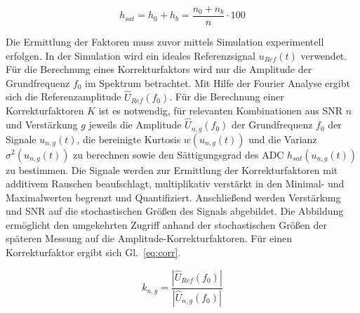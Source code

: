 \begin{equation}
	\label{eq:dist_sat}
	h_{sat} = h_0 + h_b = \frac{n_0 + n_b}{n} \cdot 100
\end{equation}

Die Ermittlung der Faktoren muss zuvor mittels Simulation experimentell erfolgen. In der Simulation wird ein ideales Referenzsignal $u_{Ref}(t)$ verwendet. Für die Berechnung eines Korrekturfaktors wird nur die Amplitude der Grundfrequenz $f_0$ im Spektrum betrachtet. Mit Hilfe der Fourier Analyse ergibt sich die Referenzamplitude $\hat{U}_{Ref}(f_0)$. Für die Berechnung einer Korrekturfaktoren $K$ ist es notwendig, für relevanten Kombinationen aus SNR $n$ und Verstärkung $g$ jeweils die Amplitude $\hat{U}_{n,g}(f_0)$ der Grundfrequenz $f_0$ der Signale $u_{n,g}(t)$, die bereinigte Kurtosis $w(u_{n,g}(t))$ und die Varianz $\sigma^2(u_{n,g}(t))$ zu berechnen sowie den Sättigungsgrad des ADC $h_{sat}(u_{n,g}(t))$ zu bestimmen. Die Signale werden zur Ermittlung der Korrekturfaktoren mit additivem Rauschen beaufschlagt, multiplikativ verstärkt in den Minimal- und Maximalwerten begrenzt und Quantifiziert. Anschließend werden Verstärkung und SNR auf die stochastischen Größen des Signals abgebildet. Die Abbildung ermöglicht den umgekehrten Zugriff anhand der stochastischen Größen der späteren Messung auf die Amplitude-Korrekturfaktoren.
Für einen Korrekturfaktor ergibt sich Gl.~\eqref{eq:corr}.

\begin{equation}
	\label{eq:corr}
	k_{n,g} = \frac{|\hat{U}_{Ref}(f_0)|}{|\hat{U}_{n,g}(f_0)|} %
\end{equation}

